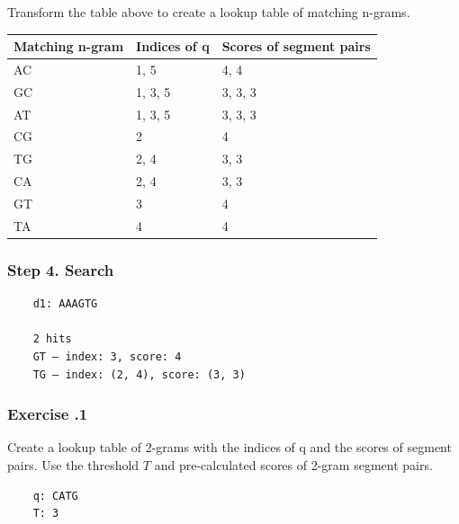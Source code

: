 Transform the table above to create a lookup table of matching n-grams.
\begin{table}[H]
\small
\begin{tabular}{|l|l|l|}
\hline
\textbf{Matching n-gram} & \textbf{Indices of q} & \textbf{Scores of segment pairs} \\ \hline
AC                       & 1, 5                  & 4, 4                             \\ \hline
GC                       & 1, 3, 5               & 3, 3, 3                          \\ \hline
AT                       & 1, 3, 5               & 3, 3, 3                          \\ \hline
CG                       & 2                     & 4                                \\ \hline
TG                       & 2, 4                  & 3, 3                             \\ \hline
CA                       & 2, 4                  & 3, 3                             \\ \hline
GT                       & 3                     & 4                                \\ \hline
TA                       & 4                     & 4                                \\ \hline
\end{tabular}
\end{table}

%
%
\subsubsection*{Step 4. Search} 

\begin{verbatim}
    d1: AAAGTG 
    
    2 hits
    GT – index: 3, score: 4
    TG – index: (2, 4), score: (3, 3)
\end{verbatim}

%
%
\subsubsection*{Exercise \thesection.1}
Create a lookup table of 2-grams with the indices of q and the scores of segment pairs. Use the threshold $T$ and pre-calculated scores of 2-gram segment pairs.

\begin{verbatim}
    q: CATG
    T: 3
\end{verbatim}

